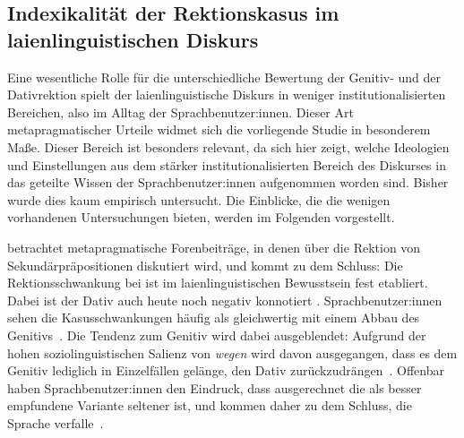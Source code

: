 \subsection{Indexikalität der Rektionskasus im laienlinguistischen Diskurs} \label{sec:IndexikalitaetRektionskasusheute}
Eine wesentliche Rolle für die unterschiedliche Bewertung der Genitiv- und der Dativrektion spielt der laienlinguistische Diskurs in weniger institutionalisierten Bereichen, also im Alltag der Sprachbenutzer:innen. 
Dieser Art metapragmatischer Urteile widmet sich die vorliegende Studie in besonderem Maße. 
Dieser Bereich ist besonders relevant, da sich hier zeigt, welche Ideologien und Einstellungen aus dem stärker institutionalisierten Bereich des Diskurses in das geteilte Wissen der Sprachbenutzer:innen aufgenommen worden sind. 
Bisher wurde dies kaum empirisch untersucht. 
Die Einblicke, die die wenigen vorhandenen Untersuchungen bieten, werden im Folgenden vorgestellt. 

\citet[]{Szczepaniak2014} betrachtet metapragmatische Forenbeiträge, in denen über die Rektion von Sekundärpräpositionen diskutiert wird, und kommt zu dem Schluss:
\glqq Die Rektionsschwankung bei \wegen{} ist im laienlinguistischen Bewusstsein fest etabliert. Dabei ist der Dativ auch heute noch negativ konnotiert\grqq{} \citep[45]{Szczepaniak2014}.  
Sprachbenutzer:innen sehen die Kasusschwankungen h{\"a}ufig als gleichwertig mit einem Abbau des Genitivs~\citep[s.][45]{Szczepaniak2014}. 
Die Tendenz zum Genitiv wird dabei ausgeblendet: Aufgrund der hohen soziolinguistischen Salienz von \textit{wegen }wird davon ausgegangen, dass es dem Genitiv lediglich in Einzelf{\"a}llen gel{\"a}nge, den Dativ zur{\"u}ckzudr{\"a}ngen~\citep[s.][45, 46]{Szczepaniak2014}.
Offenbar haben Sprachbenutzer:innen den Eindruck, dass ausgerechnet die als besser empfundene Variante seltener ist, und kommen daher zu dem Schluss, die Sprache verfalle~\citep[s.][36]{Szczepaniak2014}. 


